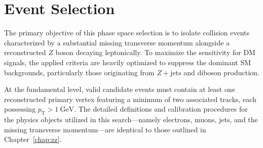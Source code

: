 \section{Event Selection}
\label{sec:monoZ_selection}

The primary objective of this phase space selection is to isolate collision events characterized by a substantial missing transverse momentum alongside a reconstructed $Z$ boson decaying leptonically. To maximize the sensitivity for DM signals, the applied criteria are heavily optimized to suppress the dominant SM backgrounds, particularly those originating from $Z+\text{jets}$ and diboson production.


At the fundamental level, valid candidate events must contain at least one reconstructed primary vertex featuring a minimum of two associated tracks, each possessing $p_{\text{T}} > 1~\text{GeV}$. The detailed definitions and calibration procedures for the physics objects utilized in this search—namely electrons, muons, jets, and the missing transverse momentum—are identical to those outlined in Chapter~\ref{chap:zz}.



